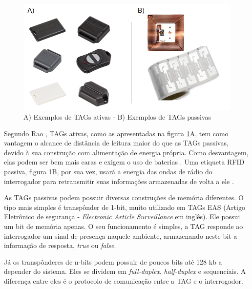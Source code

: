 \begin{figure}[H]
    \centering
    \includegraphics[width=0.8\linewidth]{figs/Fundamentos/tags.png}
    \caption{A) Exemplos de TAGs ativas \cite{wavetrend} - B) Exemplos de TAGs passivas \cite{IDTechEx} \cite{RFIDInsider}}
    \label{fig:tags-fundam}
\end{figure}





Segundo Rao \cite{rao1999overview}, TAGs ativas, como as apresentadas na figura \ref{fig:tags-fundam}A, tem como vantagem o alcance de distância de leitura maior do que as TAGs passivas, devido à sua construção com alimentação de energia própria. Como desvantagem, elas podem ser bem mais caras e exigem o uso de baterias \cite{rao1999overview}. Uma etiqueta RFID passiva, figura \ref{fig:tags-fundam}B, por sua vez, usará a energia das ondas de rádio do interrogador para retransmitir suas informações armazenadas de volta a ele \cite{EPC-RFID-link}.

As TAGs passivas podem possuir diversas construções de memória diferentes. O tipo mais simples é transpônder de 1-bit, muito utilizado em TAGs EAS (Artigo Eletrônico de segurança - \textit{Electronic Article Surveillance} em inglês). Ele possui um bit de memória apenas. O seu funcionamento é simples, a TAG responde ao interrogador um sinal de presença naquele ambiente, armazenando neste bit a informação de resposta, \textit{true} ou \textit{false}. \cite{book:klaus}

Já os transpônderes de n-bits podem possuir de poucos bits até 128 kb a depender do sistema. Eles se dividem em \textit{full-duplex}, \textit{half-duplex} e sequenciais. A diferença entre eles é o protocolo de comunicação entre a TAG e o interrogador. \cite{book:klaus}

